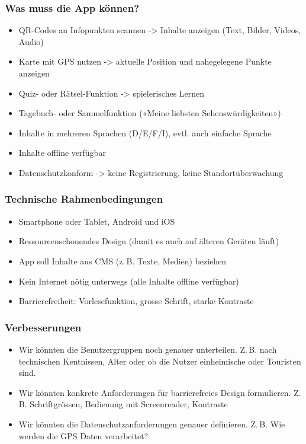 \documentclass[10pt]{article}
\begin{document}
	\subsubsection[Was]{Was muss die App können?}
	\begin{itemize}
		\item QR-Codes an Infopunkten scannen -> Inhalte anzeigen (Text, Bilder, Videos, Audio)
		\item Karte mit GPS nutzen -> aktuelle Position und nahegelegene Punkte anzeigen
		\item Quiz- oder Rätsel-Funktion -> spielerisches Lernen
		\item Tagebuch- oder Sammelfunktion («Meine liebsten Sehenswürdigkeiten»)
		\item Inhalte in mehreren Sprachen (D/E/F/I), evtl. auch einfache Sprache
		\item Inhalte offline verfügbar
		\item Datenschutzkonform -> keine Registrierung, keine Standortüberwachung
	\end{itemize}
	\subsubsection[Womit]{Technische Rahmenbedingungen}
	\begin{itemize}
		\item Smartphone oder Tablet, Android und iOS
		\item Ressourcenschonendes Design (damit es auch auf älteren Geräten läuft)
		\item App soll Inhalte aus CMS (z.\,B. Texte, Medien) beziehen
		\item Kein Internet nötig unterwegs (alle Inhalte offline verfügbar)
		\item Barrierefreiheit: Vorlesefunktion, grosse Schrift, starke Kontraste
	\end{itemize}
	\subsubsection[Verbesserungen]{Verbesserungen}
		\begin{itemize}
			\item Wir könnten die Benutzergruppen noch genauer unterteilen. Z.\,B. nach technischen Kentnissen, Alter oder ob die Nutzer einheimische oder Touristen sind.
			\item Wir könnten konkrete Anforderungen für barrierefreies Design formulieren. Z.\,B. Schriftgrössen, Bedienung mit Screenreader, Kontraste
			\item Wir könnten die Datenschutzanforderungen genauer definieren. Z.\,B. Wie werden die GPS Daten verarbeitet?
		\end{itemize}
		\pagebreak
\end{document}
